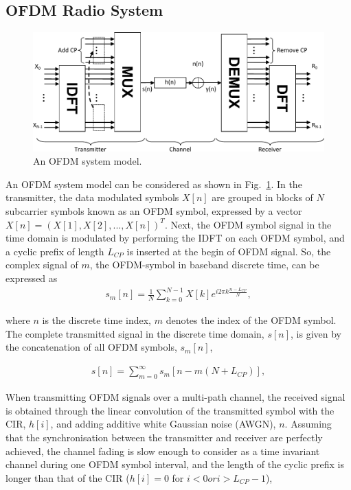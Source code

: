 \subsection{OFDM Radio System}
\begin{figure}
	\centerline{\includegraphics [width=0.8\columnwidth] {Figures/OFDM-model.pdf} }
	\caption{An OFDM system model.}
	\label{fig:OFDM-model}
\end{figure}
An OFDM system model can be considered as shown in Fig.~\ref{fig:OFDM-model}.
In the transmitter, the data modulated symbols $X[n]$ are grouped in blocks of $N$ subcarrier symbols known as an OFDM symbol, expressed by a vector $X[n]=(X[1], X[2], ..., X[n])^T$.
Next, the OFDM symbol signal in the time domain is modulated by performing the IDFT on each OFDM symbol, and a cyclic prefix of length $L_{CP}$ is inserted at the begin of OFDM signal.
So, the complex signal of $m$, the OFDM-symbol in baseband discrete time, can be expressed as
\begin{eqnarray}
\label{equ:OFDMsymbol}
s_{m}[n] = \frac{1}{N} \sum_{k=0}^{N-1}X[k]e^{i2\pi k\frac{n-L_{CP}}{N}},
\end{eqnarray}

where $n$ is the discrete time index, $m$ denotes the index of the OFDM symbol.
The complete transmitted signal in the discrete time domain, $s[n]$, is given by the concatenation of all OFDM symbols, $s_{m}[n]$,

\begin{eqnarray}
\label{equ:OFDMsignal}
s[n] =  \sum_{m=0}^{\infty} s_{m}[n-m(N+L_{CP})],
\end{eqnarray}

When transmitting OFDM signals over a multi-path channel, the received signal is obtained through the linear convolution of the transmitted symbol with the CIR, $h[i]$, and adding additive white Gaussian noise (AWGN), $n$.
Assuming that the synchronisation between the transmitter and receiver are perfectly achieved, the channel fading is slow enough to consider as a time invariant channel during one OFDM symbol interval, and the length of the cyclic prefix is longer than that of the CIR ($h[i] = 0$ for $i < 0 or i > L_{CP}-1$),

